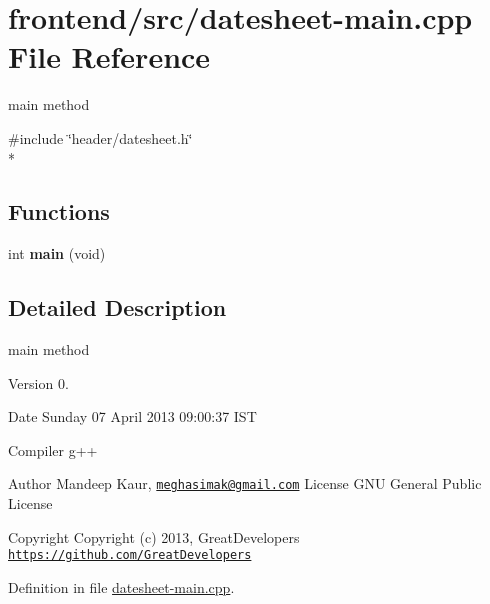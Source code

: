 \hypertarget{datesheet-main_8cpp}{\section{frontend/src/datesheet-\/main.cpp File Reference}
\label{datesheet-main_8cpp}
}


main method  


{\ttfamily \#include \char`\"{}header/datesheet.\-h\char`\"{}}\\*
\subsection*{Functions}
\begin{DoxyCompactItemize}
\item 
\hypertarget{datesheet-main_8cpp_a840291bc02cba5474a4cb46a9b9566fe}{int {\bfseries main} (void)}\label{datesheet-main_8cpp_a840291bc02cba5474a4cb46a9b9566fe}

\end{DoxyCompactItemize}


\subsection{Detailed Description}
main method \begin{DoxyVersion}{Version}
0. 
\end{DoxyVersion}
\begin{DoxyDate}{Date}
Sunday 07 April 2013 09\-:00\-:37 I\-S\-T\par
 Compiler g++
\end{DoxyDate}
\begin{DoxyAuthor}{Author}
Mandeep Kaur, \href{mailto:meghasimak@gmail.com}{\tt meghasimak@gmail.\-com} License G\-N\-U General Public License 
\end{DoxyAuthor}
\begin{DoxyCopyright}{Copyright}
Copyright (c) 2013, Great\-Developers \href{https://github.com/GreatDevelopers}{\tt https\-://github.\-com/\-Great\-Developers} 
\end{DoxyCopyright}


Definition in file \hyperlink{datesheet-main_8cpp_source}{datesheet-\/main.\-cpp}.


